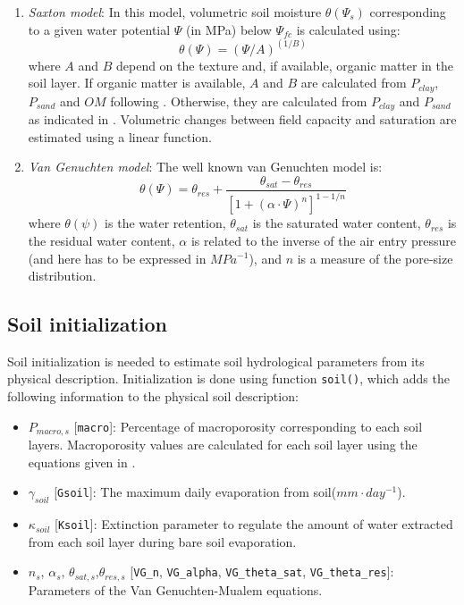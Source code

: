 \documentclass[]{book}
\providecommand{\tightlist}{%
  \setlength{\itemsep}{0pt}\setlength{\parskip}{0pt}}
\begin{document}
\begin{enumerate}
\def\labelenumi{\arabic{enumi}.}
\tightlist
\item
  \emph{Saxton model}: In this model, volumetric soil moisture \(\theta(\Psi_s)\) corresponding to a given water potential \(\Psi\) (in MPa) below \(\Psi_{fc}\) is calculated using:
  \begin{equation}\theta(\Psi) = (\Psi/A)^{(1/B)}\end{equation}
  where \(A\) and \(B\) depend on the texture and, if available, organic matter in the soil layer. If organic matter is available, \(A\) and \(B\) are calculated from \(P_{clay}\), \(P_{sand}\) and \(OM\) following \citet{Saxton2006}. Otherwise, they are calculated from \(P_{clay}\) and \(P_{sand}\) as indicated in \citet{Saxton1986}. Volumetric changes between field capacity and saturation are estimated using a linear function.
\item
  \emph{Van Genuchten model}: The well known van Genuchten \citeyearpar{Genuchten1980} model is:
  \begin{equation}\theta(\Psi) = \theta_{res}+\frac{\theta_{sat}-\theta_{res}}{\left[1+ (\alpha \cdot \Psi)^n \right]^{1-1/n}}\end{equation}
  where \(\theta(\psi)\) is the water retention, \(\theta_{sat}\) is the saturated water content, \(\theta_{res}\) is the residual water content, \(\alpha\) is related to the inverse of the air entry pressure (and here has to be expressed in \(MPa^{-1}\)), and \(n\) is a measure of the pore-size distribution.
\end{enumerate}

\hypertarget{soil-initialization}{%
\subsection{Soil initialization}\label{soil-initialization}}

Soil initialization is needed to estimate soil hydrological parameters from its physical description. Initialization is done using function \texttt{soil()}, which adds the following information to the physical soil description:

\begin{itemize}
\tightlist
\item
  \(P_{macro, s}\) {[}\texttt{macro}{]}: Percentage of macroporosity corresponding to each soil layers. Macroporosity values are calculated for each soil layer using the equations given in \citet{Stolf2011}.
\item
  \(\gamma_{soil}\) {[}\texttt{Gsoil}{]}: The maximum daily evaporation from soil(\(mm \cdot day^{-1}\)).
\item
  \(\kappa_{soil}\) {[}\texttt{Ksoil}{]}: Extinction parameter to regulate the amount of water extracted from each soil layer during bare soil evaporation.
\item
  \(n_{s}\), \(\alpha_{s}\), \(\theta_{sat,s}\),\(\theta_{res,s}\) {[}\texttt{VG\_n}, \texttt{VG\_alpha}, \texttt{VG\_theta\_sat}, \texttt{VG\_theta\_res}{]}: Parameters of the Van Genuchten-Mualem equations.
\end{itemize}
\end{document}
